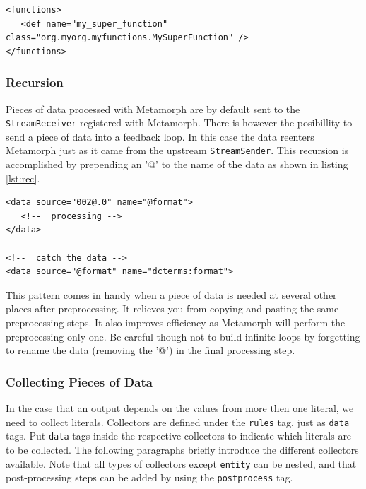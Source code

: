\documentclass[12pt,a4paper]{article}
\begin{document}
\begin{lstlisting}[float=htb, label=def,caption=User defined functions.]
<functions>
   <def name="my_super_function" class="org.myorg.myfunctions.MySuperFunction" />
</functions> 
\end{lstlisting}


\subsubsection{Recursion}\label{recursion}

Pieces of data processed with Metamorph are by default sent to the {\tt StreamReceiver} registered with Metamorph. There is however the posibillity to send a piece of data into a feedback loop. In this case the data reenters Metamorph just as it came from the upstream {\tt StreamSender}. This recursion is accomplished by prepending an '@' to the name of the data as shown in listing \ref{lst:rec}. 

\begin{lstlisting}[float=htb,label=lst:rec,caption=Prepending '@' to the literal name to enable recursive processing.]
<data source="002@.0" name="@format">
   <!--  processing -->
</data>

<!--  catch the data -->
<data source="@format" name="dcterms:format">
\end{lstlisting}

This pattern comes in handy when a piece of data is needed at several other places after preprocessing. It relieves you from copying and pasting the same preprocessing steps. It also improves efficiency as Metamorph will perform the preprocessing only one. Be careful though not to build infinite loops by forgetting to rename the data (removing the '@') in the final processing step.

\subsubsection{Collecting Pieces of Data}\label{collect}

In the case that an output depends on the values from more then one literal, we need to collect literals. Collectors are defined under the {\tt rules} tag, just as {\tt data} tags. Put {\tt data} tags inside the respective collectors to indicate which literals are to be collected. The following paragraphs briefly introduce the different collectors available. Note that all types of collectors except {\tt entity} can be nested, and that post-processing steps can be added by using the {\tt postprocess} tag. 
\end{document}
